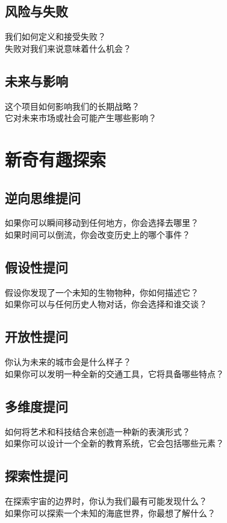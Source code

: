 \documentclass[12pt]{book}
\begin{document}
\subsection{风险与失败}
我们如何定义和接受失败？\\
失败对我们来说意味着什么机会？\\

\subsection{未来与影响}
这个项目如何影响我们的长期战略？\\
它对未来市场或社会可能产生哪些影响？\\

\section{新奇有趣探索}
\subsection{逆向思维提问}
如果你可以瞬间移动到任何地方，你会选择去哪里？\\
如果时间可以倒流，你会改变历史上的哪个事件？\\

\subsection{假设性提问}
假设你发现了一个未知的生物物种，你如何描述它？\\
如果你可以与任何历史人物对话，你会选择和谁交谈？\\

\subsection{开放性提问}
你认为未来的城市会是什么样子？\\
如果你可以发明一种全新的交通工具，它将具备哪些特点？\\

\subsection{多维度提问}
如何将艺术和科技结合来创造一种新的表演形式？\\
如果你可以设计一个全新的教育系统，它会包括哪些元素？\\

\subsection{探索性提问}
在探索宇宙的边界时，你认为我们最有可能发现什么？\\
如果你可以探索一个未知的海底世界，你最想了解什么？\\
\end{document}
